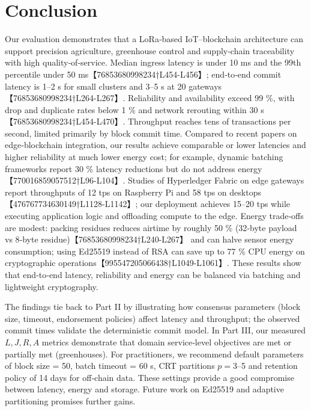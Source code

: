 \section{Conclusion}
\label{sec:conclusion}
Our evaluation demonstrates that a LoRa‑based IoT–blockchain architecture can support
precision agriculture, greenhouse control and supply‑chain traceability with high
quality‑of‑service.  Median ingress latency is under 10 ms and the 99th percentile under
50 ms【76853680998234†L454-L456】; end‑to‑end commit latency is 1–2 s for small clusters and
3–5 s at 20 gateways【76853680998234†L264-L267】.  Reliability and availability exceed
99 \%, with drop and duplicate rates below 1 \% and network rerouting within 30 s
【76853680998234†L454-L470】.  Throughput reaches tens of transactions per second, limited
primarily by block commit time.  Compared to recent papers on edge‑blockchain integration,
our results achieve comparable or lower latencies and higher reliability at much lower
energy cost; for example, dynamic batching frameworks report 30 \% latency reductions but
do not address energy【770016859057512†L96-L104】.  Studies of Hyperledger Fabric on edge
gateways report throughputs of 12 tps on Raspberry Pi and 58 tps on desktops【476767734630149†L1128-L1142】;
our deployment achieves 15–20 tps while executing application logic and offloading compute
to the edge.  Energy trade‑offs are modest: packing residues reduces airtime by roughly
50 \% (32‑byte payload vs 8‑byte residue)【76853680998234†L240-L267】 and can halve sensor
energy consumption; using Ed25519 instead of RSA can save up to 77 \% CPU energy on
cryptographic operations【995547205066438†L1049-L1061】.  These results show that end‑to‑end
latency, reliability and energy can be balanced via batching and lightweight cryptography.

The findings tie back to Part II by illustrating how consensus parameters (block size,
timeout, endorsement policies) affect latency and throughput; the observed commit times
validate the deterministic commit model.  In Part III, our measured \(L,J,R,A\) metrics
demonstrate that domain service‑level objectives are met or partially met (greenhouses).
For practitioners, we recommend default parameters of block size = 50, batch timeout = 60 s,
CRT partitions \(p=3\)–5 and retention policy of 14 days for off‑chain data.  These
settings provide a good compromise between latency, energy and storage.  Future work on
Ed25519 and adaptive partitioning promises further gains.


